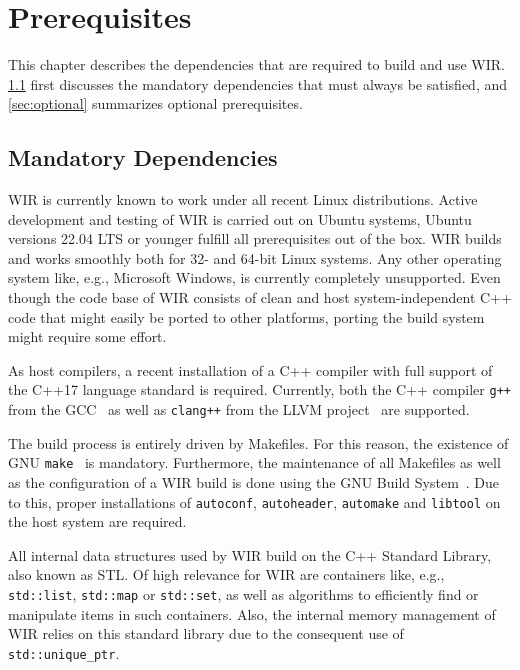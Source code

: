 \chapter{Prerequisites}
\label{chap:prerequisites}
\renewcommand{\sectiontitle}{}

This chapter describes the dependencies that are required to build and use \gls{WIR}.
\cref{sec:mandatory} first discusses the mandatory dependencies that must always be satisfied, and \cref{sec:optional} summarizes optional prerequisites.


\section{Mandatory Dependencies}
\label{sec:mandatory}

\gls{WIR} is currently known to work under all recent Linux distributions.
Active development and testing of \gls{WIR} is carried out on Ubuntu systems, Ubuntu versions 22.04 LTS or younger fulfill all prerequisites out of the box.
\gls{WIR} builds and works smoothly both for 32- and 64-bit Linux systems.
Any other operating system like, e.g., Microsoft Windows, is currently completely unsupported.
Even though the code base of \gls{WIR} consists of clean and host system-independent C++ code that might easily be ported to other platforms, porting the build system might require some effort.

As host compilers, a recent installation of a C++ compiler with full support of the C++17 language standard is required.
Currently, both the C++ compiler \texttt{g++} from the \gls{GCC}~\cite{gcc26} as well as \texttt{clang++} from the LLVM project~\cite{llvm26} are supported.

The build process is entirely driven by Makefiles.
For this reason, the existence of GNU \texttt{make}~\cite{gnumake26} is mandatory.
Furthermore, the maintenance of all Makefiles as well as the configuration of a \gls{WIR} build is done using the GNU Build System~\cite{gnubuild26}.
Due to this, proper installations of \texttt{autoconf}, \texttt{autoheader}, \texttt{automake} and \texttt{libtool} on the host system are required.

All internal data structures used by \gls{WIR} build on the C++ Standard Library, also known as \gls{STL}.
Of high relevance for \gls{WIR} are containers like, e.g., \texttt{std::list}, \texttt{std::map} or \texttt{std::set}, as well as algorithms to efficiently find or manipulate items in such containers.
Also, the internal memory management of \gls{WIR} relies on this standard library due to the consequent use of \texttt{std::unique\_ptr}.


